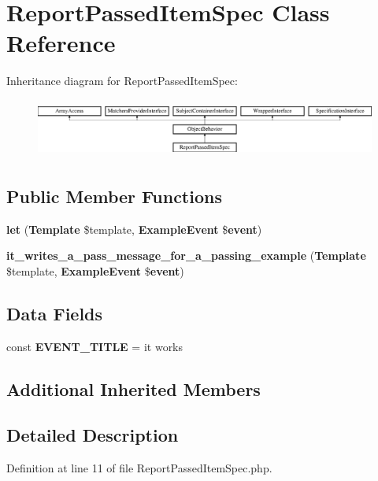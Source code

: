\section{Report\+Passed\+Item\+Spec Class Reference}
\label{classspec_1_1_php_spec_1_1_formatter_1_1_html_1_1_report_passed_item_spec}
Inheritance diagram for Report\+Passed\+Item\+Spec\+:\begin{figure}[H]
\begin{center}
\leavevmode
\includegraphics[height=1.953488cm]{classspec_1_1_php_spec_1_1_formatter_1_1_html_1_1_report_passed_item_spec}
\end{center}
\end{figure}
\subsection*{Public Member Functions}
\begin{DoxyCompactItemize}
\item 
{\bf let} ({\bf Template} \$template, {\bf Example\+Event} \${\bf event})
\item 
{\bf it\+\_\+writes\+\_\+a\+\_\+pass\+\_\+message\+\_\+for\+\_\+a\+\_\+passing\+\_\+example} ({\bf Template} \$template, {\bf Example\+Event} \${\bf event})
\end{DoxyCompactItemize}
\subsection*{Data Fields}
\begin{DoxyCompactItemize}
\item 
const {\bf E\+V\+E\+N\+T\+\_\+\+T\+I\+T\+L\+E} = \textquotesingle{}it works\textquotesingle{}
\end{DoxyCompactItemize}
\subsection*{Additional Inherited Members}


\subsection{Detailed Description}


Definition at line 11 of file Report\+Passed\+Item\+Spec.\+php.



